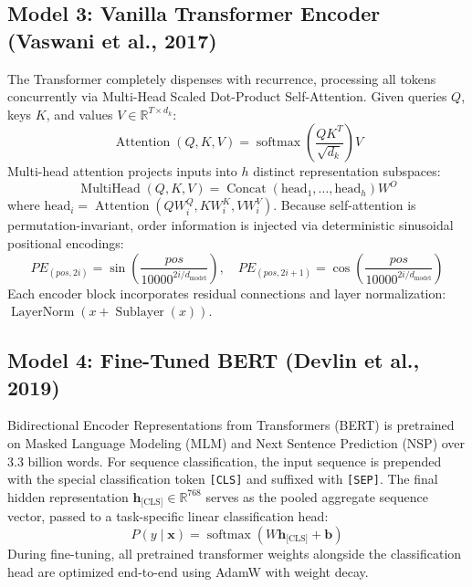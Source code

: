 \documentclass[12pt,a4paper]{report}
\begin{document}
\subsection{Model 3: Vanilla Transformer Encoder (Vaswani et al., 2017)}
The Transformer completely dispenses with recurrence, processing all tokens concurrently via Multi-Head Scaled Dot-Product Self-Attention. Given queries $Q$, keys $K$, and values $V \in \mathbb{R}^{T \times d_k}$:
\begin{equation}
    \operatorname{Attention}(Q, K, V) = \operatorname{softmax}\left( \frac{QK^T}{\sqrt{d_k}} \right) V
\end{equation}
Multi-head attention projects inputs into $h$ distinct representation subspaces:
\begin{equation}
    \operatorname{MultiHead}(Q, K, V) = \operatorname{Concat}(\text{head}_1, \dots, \text{head}_h) W^O
\end{equation}
where $\text{head}_i = \operatorname{Attention}(QW_i^Q, KW_i^K, VW_i^V)$. Because self-attention is permutation-invariant, order information is injected via deterministic sinusoidal positional encodings:
\begin{equation}
    PE_{(pos, 2i)} = \sin\left(\frac{pos}{10000^{2i/d_{\text{model}}}}\right), \quad PE_{(pos, 2i+1)} = \cos\left(\frac{pos}{10000^{2i/d_{\text{model}}}}\right)
\end{equation}
Each encoder block incorporates residual connections and layer normalization: $\operatorname{LayerNorm}(x + \operatorname{Sublayer}(x))$.

\subsection{Model 4: Fine-Tuned BERT (Devlin et al., 2019)}
Bidirectional Encoder Representations from Transformers (BERT) is pretrained on Masked Language Modeling (MLM) and Next Sentence Prediction (NSP) over 3.3 billion words. For sequence classification, the input sequence is prepended with the special classification token \texttt{[CLS]} and suffixed with \texttt{[SEP]}. The final hidden representation $\mathbf{h}_{\text{[CLS]}} \in \mathbb{R}^{768}$ serves as the pooled aggregate sequence vector, passed to a task-specific linear classification head:
\begin{equation}
    P(y \mid \mathbf{x}) = \operatorname{softmax}(W \mathbf{h}_{\text{[CLS]}} + \mathbf{b})
\end{equation}
During fine-tuning, all pretrained transformer weights alongside the classification head are optimized end-to-end using AdamW with weight decay.
\end{document}
